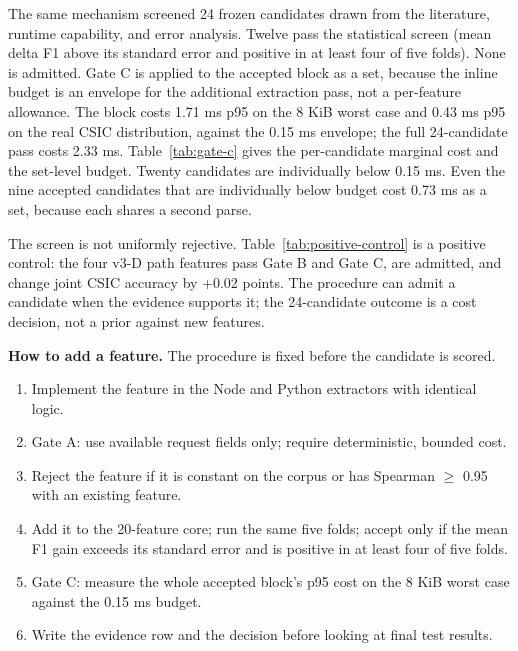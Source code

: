 \documentclass[preprint,11pt]{elsarticle}
\providecommand{\tightlist}{}
\begin{document}
The same mechanism screened 24 frozen candidates drawn from the
literature, runtime capability, and error analysis. Twelve pass the
statistical screen (mean delta F1 above its standard error and positive
in at least four of five folds). None is admitted. Gate C is applied to
the accepted block as a set, because the inline budget is an envelope
for the additional extraction pass, not a per-feature allowance. The
block costs 1.71 ms p95 on the 8 KiB worst case and 0.43 ms p95 on the
real CSIC distribution, against the 0.15 ms envelope; the full
24-candidate pass costs 2.33 ms. Table~\ref{tab:gate-c} gives the per-candidate
marginal cost and the set-level budget. Twenty candidates are
individually below 0.15 ms. Even the nine accepted candidates that are
individually below budget cost 0.73 ms as a set, because each shares a
second parse.

The screen is not uniformly rejective. Table~\ref{tab:positive-control} is a positive control:
the four v3-D path features pass Gate B and Gate C, are admitted, and
change joint CSIC accuracy by +0.02 points. The procedure can admit a
candidate when the evidence supports it; the 24-candidate outcome is a
cost decision, not a prior against new features.

\textbf{How to add a feature.} The procedure is fixed before the
candidate is scored.

\begin{enumerate}
\def\labelenumi{\arabic{enumi}.}
\tightlist
\item
  Implement the feature in the Node and Python extractors with identical
  logic.
\item
  Gate A: use available request fields only; require deterministic,
  bounded cost.
\item
  Reject the feature if it is constant on the corpus or has
  \textbar Spearman\textbar{} $\ge$ 0.95 with an existing
  feature.
\item
  Add it to the 20-feature core; run the same five folds; accept only if
  the mean F1 gain exceeds its standard error and is positive in at
  least four of five folds.
\item
  Gate C: measure the whole accepted block's p95 cost on the 8 KiB worst
  case against the 0.15 ms budget.
\item
  Write the evidence row and the decision before looking at final test
  results.
\end{enumerate}
\end{document}
